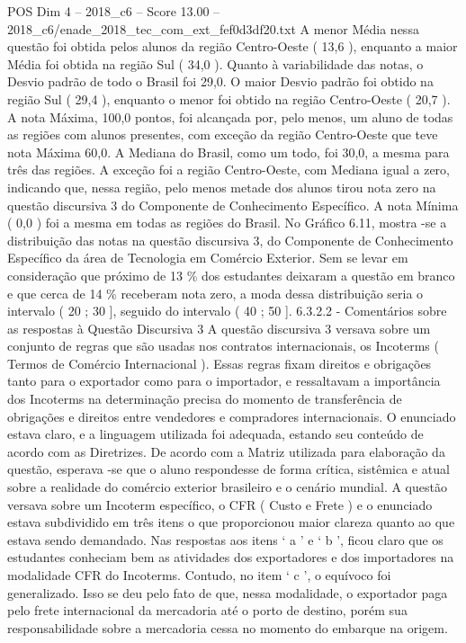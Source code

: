 \begin{textsample}{POS Dim 4 – 2018\_c6 – Score 13.00 – 2018\_c6/enade\_2018\_tec\_com\_ext\_fef0d3df20.txt}
A menor Média nessa questão foi obtida pelos alunos da região Centro-Oeste ( 13,6 ), enquanto a maior Média foi obtida na região Sul ( 34,0 ).
Quanto à variabilidade das notas, o Desvio padrão de todo o Brasil foi 29,0.
O maior Desvio padrão foi obtido na região Sul ( 29,4 ), enquanto o menor foi obtido na região Centro-Oeste ( 20,7 ).
A nota Máxima, 100,0 pontos, foi alcançada por, pelo menos, um aluno de todas as regiões com alunos presentes, com exceção da região Centro-Oeste que teve nota Máxima 60,0.
A Mediana do Brasil, como um todo, foi 30,0, a mesma para três das regiões.
A exceção foi a região Centro-Oeste, com Mediana igual a zero, indicando que, nessa região, pelo menos metade dos alunos tirou nota zero na questão discursiva 3 do Componente de Conhecimento Específico.
A nota Mínima ( 0,0 ) foi a mesma em todas as regiões do Brasil.
No Gráfico 6.11, mostra -se a distribuição das notas na questão discursiva 3, do Componente de Conhecimento Específico da área de Tecnologia em Comércio Exterior.
Sem se levar em consideração que próximo de 13 \% dos estudantes deixaram a questão em branco e que cerca de 14 \% receberam nota zero, a moda dessa distribuição seria o intervalo ( 20 ; 30 ], seguido do intervalo ( 40 ; 50 ]. 6.3.2.2 - Comentários sobre as respostas à Questão Discursiva 3 A questão discursiva 3 versava sobre um conjunto de regras que são usadas nos contratos internacionais, os Incoterms ( Termos de Comércio Internacional ).
Essas regras fixam direitos e obrigações tanto para o exportador como para o importador, e ressaltavam a importância dos Incoterms na determinação precisa do momento de transferência de obrigações e direitos entre vendedores e compradores internacionais.
O enunciado estava claro, e a linguagem utilizada foi adequada, estando seu conteúdo de acordo com as Diretrizes.
De acordo com a Matriz utilizada para elaboração da questão, esperava -se que o aluno respondesse de forma crítica, sistêmica e atual sobre a realidade do comércio exterior brasileiro e o cenário mundial.
A questão versava sobre um Incoterm específico, o CFR ( Custo e Frete ) e o enunciado estava subdividido em três itens o que proporcionou maior clareza quanto ao que estava sendo demandado.
Nas respostas aos itens ‘ a ’ e ‘ b ’, ficou claro que os estudantes conheciam bem as atividades dos exportadores e dos importadores na modalidade CFR do Incoterms.
Contudo, no item ‘ c ’, o equívoco foi generalizado.
Isso se deu pelo fato de que, nessa modalidade, o exportador paga pelo frete internacional da mercadoria até o porto de destino, porém sua responsabilidade sobre a mercadoria cessa no momento do embarque na origem.

\end{textsample}
